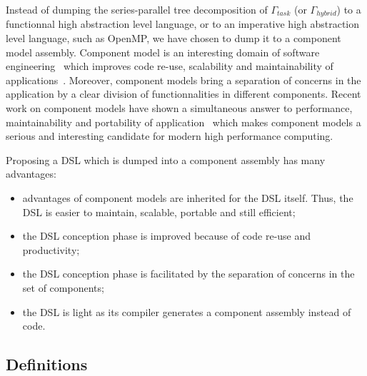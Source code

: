 Instead of dumping the series-parallel tree decomposition of $\Gamma_{task}$ (or $\Gamma_{hybrid}$) to a functionnal high abstraction level language, or to an imperative high abstraction level language, such as OpenMP, we have chosen to dump it to a component model assembly. Component model is an interesting domain of software engineering~\cite{Szyperski:2002:CSB:515228} which improves code re-use, scalability and maintainability of applications~\cite{Szyperski:2002:CSB:515228,bigot:inria-00388508}. Moreover, component models bring a separation of concerns in the application by a clear division of functionnalities in different components.
Recent work on component models have shown a simultaneous answer to performance, maintainability and portability of application~\cite{l2c} which makes component models a serious and interesting candidate for modern high performance computing. 

Proposing a DSL which is dumped into a component assembly has many advantages:
\begin{itemize}
\item advantages of component models are inherited for the DSL itself. Thus, the DSL is easier to maintain, scalable, portable and still efficient; %
\item the DSL conception phase is improved because of code re-use and productivity; %
\item the DSL conception phase is facilitated by the separation of concerns in the set of components; %
\item the DSL is light as its compiler generates a component assembly instead of code. %
\end{itemize}

\subsection{Definitions}



